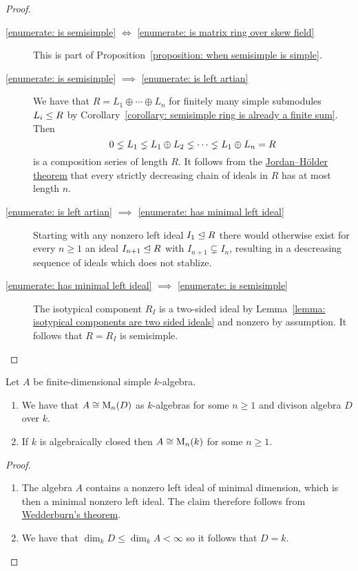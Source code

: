 \begin{proof}
  \leavevmode
  \begin{description}
    \item[\ref*{enumerate: is semisimple} $\iff$ \ref*{enumerate: is matrix ring over skew field}]
      This is part of Proposition~\ref{proposition: when semisimple is simple}.
    \item[\ref*{enumerate: is semisimple} $\implies$ \ref*{enumerate: is left artian}]
      We have that $R = L_1 \oplus \dotsb \oplus L_n$ for finitely many simple submodules $L_i \leq R$ by Corollary~\ref*{corollary: semisimple ring is already a finite sum}.
      Then
      \[
                    0
        \lneq  L_1
        \lneq  L_1 \oplus L_2
        \lneq  \dotsb
        \lneq  L_1 \oplus L_n
        =           R
      \]
      is a composition series of length $R$.
      It follows from the \hyperref[theorem: jordan hoelder theorem]{Jordan--Hölder theorem} that every strictly decreasing chain of ideals in $R$ has at most length $n$.
    \item[\ref*{enumerate: is left artian} $\implies$ \ref*{enumerate: has minimal left ideal}]
      Starting with any nonzero left ideal $I_1 \trianglelefteq R$ there would otherwise exist for every $n \geq 1$ an ideal $I_{n+1} \trianglelefteq R$ with $I_{n+1} \subsetneq I_n$, resulting in a descreasing sequence of ideals which does not stablize.
    \item[\ref*{enumerate: has minimal left ideal} $\implies$ \ref*{enumerate: is semisimple}]
      The isotypical component $R_I$ is a two-sided ideal by Lemma~\ref{lemma: isotypical components are two sided ideals} and nonzero by assumption.
      It follows that $R = R_I$ is semisimple.
    \qedhere
  \end{description}
\end{proof}


\begin{corollary}
  Let $A$ be finite-dimensional simple $k$-algebra.
  \begin{enumerate}
    \item
      We have that $A \cong \operatorname{M}_n(D)$ as $k$-algebras for some $n \geq 1$ and divison algebra $D$ over $k$.
    \item
      If $k$ is algebraically closed then $A \cong \operatorname{M}_n(k)$ for some $n \geq 1$.
  \end{enumerate}
\end{corollary}


\begin{proof}
  \leavevmode
  \begin{enumerate}
    \item
      The algebra $A$ contains a nonzero left ideal of minimal dimension, which is then a minimal nonzero left ideal.
      The claim therefore follows from \hyperref[theorem: wedderburns theorem]{Wedderburn’s theorem}.
    \item
      We have that $\dim_k D \leq \dim_k A < \infty$ so it follows that $D = k$.
    \qedhere
  \end{enumerate}
\end{proof}







